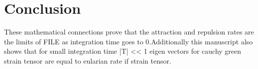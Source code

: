 \documentclass[../report.tex]{subfiles}
\begin{document}
\chapter{Conclusion}
These mathematical connections prove that the attraction and repulsion rates are the limits of FILE as integration time goes to 0.Additionally this manuscript also shows that for small integration time |T| << 1 eigen vectors for cauchy green strain tensor are equal to eularian rate if strain tensor.
\end{document}
